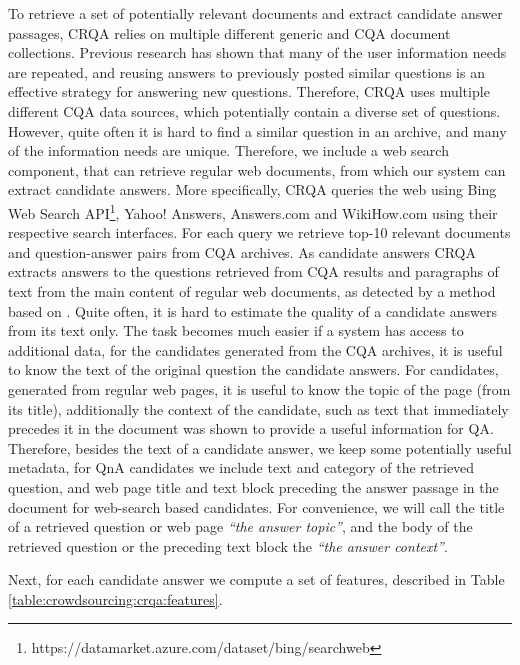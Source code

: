 To retrieve a set of potentially relevant documents and extract candidate answer passages, CRQA relies on multiple different generic and CQA document collections.
Previous research \cite{Shtok:2012:LPA:2187836.2187939} has shown that many of the user information needs are repeated, and reusing answers to previously posted similar questions is an effective strategy for answering new questions.
Therefore, CRQA uses multiple different CQA data sources, which potentially contain a diverse set of questions.
However, quite often it is hard to find a similar question in an archive, and many of the information needs are unique.
Therefore, we include a web search component, that can retrieve regular web documents, from which our system can extract candidate answers.
More specifically, CRQA queries the web using Bing Web Search API\footnote{https://datamarket.azure.com/dataset/bing/searchweb}, Yahoo! Answers, Answers.com and WikiHow.com using their respective search interfaces.
For each query we retrieve top-10 relevant documents and question-answer pairs from CQA archives.
As candidate answers CRQA extracts answers to the questions retrieved from CQA results and paragraphs of text from the main content of regular web documents, as detected by a method based on \cite{Kohlschutter_2010}.
Quite often, it is hard to estimate the quality of a candidate answers from its text only.
The task becomes much easier if a system has access to additional data, \eg for the candidates generated from the CQA archives, it is useful to know the text of the original question the candidate answers.
For candidates, generated from regular web pages, it is useful to know the topic of the page (\eg from its title), additionally the context of the candidate, such as text that immediately precedes it in the document was shown to provide a useful information for QA.
Therefore, besides the text of a candidate answer, we keep some potentially useful metadata, \eg for QnA candidates we include text and category of the retrieved question, and web page title and text block preceding the answer passage in the document for web-search based candidates.
For convenience, we will call the title of a retrieved question or web page \textit{``the answer topic''}, and the body of the retrieved question or the preceding text block the \textit{``the answer context''}.

Next, for each candidate answer we compute a set of features, described in Table \ref{table:crowdsourcing:crqa:features}.

